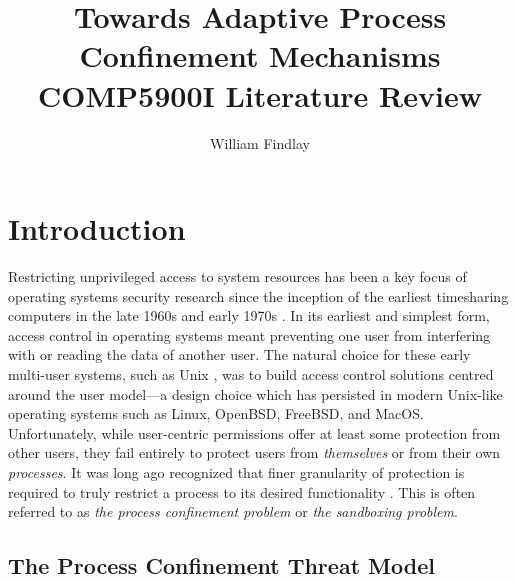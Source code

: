 \documentclass[dvipsnames, 12pt]{article}
\title{\huge Towards Adaptive Process Confinement
Mechanisms\\{\large COMP5900I Literature Review}}
\author{William Findlay}
\begin{document}
\maketitle
\thispagestyle{plain}


\setcounter{page}{1}

\clearpage

\begin{abstract}
\end{abstract}


\section{Introduction}

Restricting unprivileged access to system resources has been a key focus of
operating systems security research since the inception of the earliest
timesharing computers in the late 1960s and early 1970s . In its
earliest and simplest form, access control in operating systems meant preventing
one user from interfering with or reading the data of another user. The natural
choice for these early multi-user systems, such as Unix \cite{ritchie1973_unix},
was to build access control solutions centred around the user model---a design
choice which has persisted in modern Unix-like operating systems such as Linux,
OpenBSD, FreeBSD, and MacOS. Unfortunately, while user-centric permissions offer
at least some protection from other users, they fail entirely to protect users
from \textit{themselves} or from their own \textit{processes}.  It was long ago
recognized that finer granularity of protection is required to truly restrict
a process to its desired functionality \cite{lampson1973_a_note}. This is often
referred to as \textit{the process confinement problem} or \textit{the
sandboxing problem}.

\subsection{The Process Confinement Threat Model}
\end{document}
